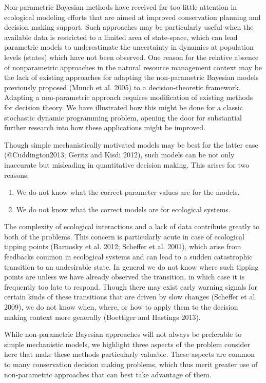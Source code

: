 \documentclass[author-year, review]{elsarticle} %
\begin{document}
Non-parametric Bayesian methods have received far too little attention
in ecological modeling efforts that are aimed at improved conservation
planning and decision making support. Such approaches may be
particularly useful when the available data is restricted to a limited
area of state-space, which can lead parametric models to underestimate
the uncertainty in dynamics at population levels (states) which have not
been observed. One reason for the relative absence of nonparametric
approaches in the natural resource management context may be the lack of
existing approaches for adapting the non-parametric Bayesian models
previously proposed (Munch et al. 2005) to a decision-theoretic
framework. Adapting a non-parametric approach requires modification of
existing methods for decision theory. We have illustrated how this might
be done for a classic stochastic dynamic programming problem, opening
the door for substantial further research into how these applications
might be improved.

Though simple mechanistically motivated models may be best for the
latter case (@Cuddington2013; Geritz and Kisdi 2012), such models can be
not only inaccurate but misleading in quantitative decision making. This
arises for two reasons:

\begin{enumerate}
\def\labelenumi{\arabic{enumi}.}
\itemsep1pt\parskip0pt
\item
  We do not know what the correct parameter values are for the models.
\item
  We do not know what the correct models are for ecological systems.
\end{enumerate}

The complexity of ecological interactions and a lack of data contribute
greatly to both of the problems. This concern is particularly acute in
case of ecological tipping points (Barnosky et al. 2012; Scheffer et al.
2001), which arise from feedbacks common in ecological systems and can
lead to a sudden catastrophic transition to an undesirable state. In
general we do not know where such tipping points are unless we have
already observed the transition, in which case it is frequently too late
to respond. Though there may exist early warning signals for certain
kinds of these transitions that are driven by slow changes (Scheffer et
al. 2009), we do not know when, where, or how to apply them to the
decision making context more generally (Boettiger and Hastings 2013).

While non-parametric Bayesian approaches will not always be preferable
to simple mechanistic models, we highlight three aspects of the problem
consider here that make these methods particularly valuable. These
aspects are common to many conservation decision making problems, which
thus merit greater use of non-parametric approaches that can best take
advantage of them.
\end{document}

